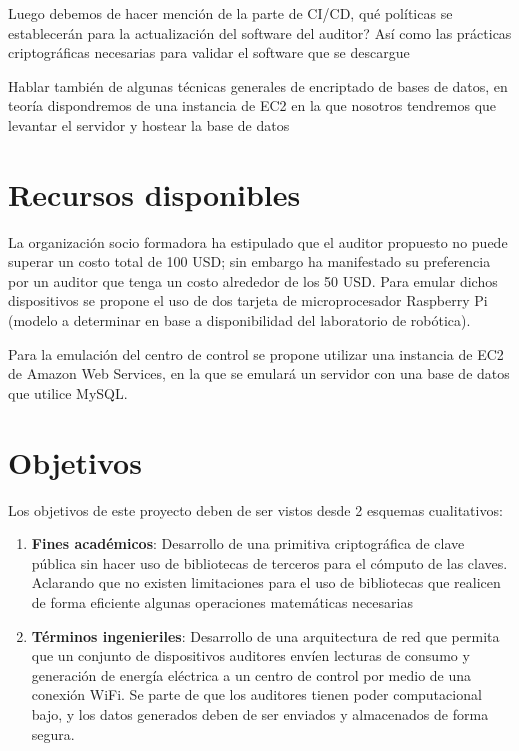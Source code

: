 \documentclass{article}
\begin{document}
        Luego debemos de hacer mención de la parte de CI/CD, qué políticas se establecerán para la actualización del software del auditor? Así como las prácticas criptográficas necesarias para validar el software que se descargue

        Hablar también de algunas técnicas generales de encriptado de bases de datos, en teoría dispondremos de una instancia de EC2 en la que nosotros tendremos que levantar el servidor y hostear la base de datos

    \section{Recursos disponibles}

        La organización socio formadora ha estipulado que el auditor propuesto no puede superar un costo total de 100 USD; sin embargo ha manifestado su preferencia por un auditor que tenga un costo alrededor de los 50 USD. Para emular dichos dispositivos se propone el uso de dos tarjeta de microprocesador Raspberry Pi (modelo a determinar en base a disponibilidad del laboratorio de robótica).

        Para la emulación del centro de control se propone utilizar una instancia de EC2 de Amazon Web Services, en la que se emulará un servidor con una base de datos que utilice MySQL.

    \section{Objetivos}

        Los objetivos de este proyecto deben de ser vistos desde 2 esquemas cualitativos:
        \begin{enumerate}
            \item \textbf{Fines académicos}: Desarrollo de una primitiva criptográfica de clave pública sin hacer uso de bibliotecas de terceros para el cómputo de las claves. Aclarando que no existen limitaciones para el uso de bibliotecas que realicen de forma eficiente algunas operaciones matemáticas necesarias
            \item \textbf{Términos ingenieriles}: Desarrollo de una arquitectura de red que permita que un conjunto de dispositivos auditores envíen lecturas de consumo y generación de energía eléctrica a un centro de control por medio de una conexión WiFi. Se parte de que los auditores tienen poder computacional bajo, y los datos generados deben de ser enviados y almacenados de forma segura.
        \end{enumerate}
\end{document}
